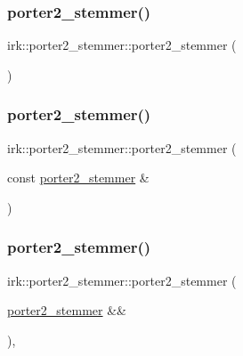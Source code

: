 \subsubsection{\texorpdfstring{porter2\+\_\+stemmer()}{porter2\_stemmer()}\hspace{0.1cm}{\footnotesize\ttfamily [1/3]}}
{\footnotesize\ttfamily irk\+::porter2\+\_\+stemmer\+::porter2\+\_\+stemmer (\begin{DoxyParamCaption}{ }\end{DoxyParamCaption})\hspace{0.3cm}{\ttfamily [default]}}

\mbox{\label{classirk_1_1porter2__stemmer_ad805217cc80850c285c036de58d72be6}} 
\subsubsection{\texorpdfstring{porter2\+\_\+stemmer()}{porter2\_stemmer()}\hspace{0.1cm}{\footnotesize\ttfamily [2/3]}}
{\footnotesize\ttfamily irk\+::porter2\+\_\+stemmer\+::porter2\+\_\+stemmer (\begin{DoxyParamCaption}\item[{const \mbox{\hyperlink{classirk_1_1porter2__stemmer}{porter2\+\_\+stemmer}} \&}]{ }\end{DoxyParamCaption})\hspace{0.3cm}{\ttfamily [inline]}}

\mbox{\label{classirk_1_1porter2__stemmer_a18ebcde742603f2fe43e4e179717f0ba}} 
\subsubsection{\texorpdfstring{porter2\+\_\+stemmer()}{porter2\_stemmer()}\hspace{0.1cm}{\footnotesize\ttfamily [3/3]}}
{\footnotesize\ttfamily irk\+::porter2\+\_\+stemmer\+::porter2\+\_\+stemmer (\begin{DoxyParamCaption}\item[{\mbox{\hyperlink{classirk_1_1porter2__stemmer}{porter2\+\_\+stemmer}} \&\&}]{ }\end{DoxyParamCaption})\hspace{0.3cm}{\ttfamily [default]}, {\ttfamily [noexcept]}}

